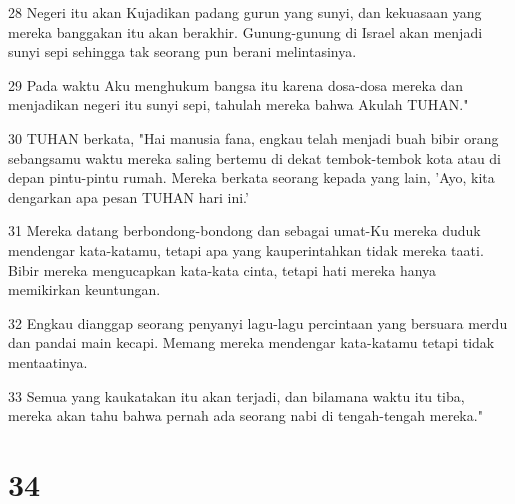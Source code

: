 \par 28 Negeri itu akan Kujadikan padang gurun yang sunyi, dan kekuasaan yang mereka banggakan itu akan berakhir. Gunung-gunung di Israel akan menjadi sunyi sepi sehingga tak seorang pun berani melintasinya.
\par 29 Pada waktu Aku menghukum bangsa itu karena dosa-dosa mereka dan menjadikan negeri itu sunyi sepi, tahulah mereka bahwa Akulah TUHAN."
\par 30 TUHAN berkata, "Hai manusia fana, engkau telah menjadi buah bibir orang sebangsamu waktu mereka saling bertemu di dekat tembok-tembok kota atau di depan pintu-pintu rumah. Mereka berkata seorang kepada yang lain, 'Ayo, kita dengarkan apa pesan TUHAN hari ini.'
\par 31 Mereka datang berbondong-bondong dan sebagai umat-Ku mereka duduk mendengar kata-katamu, tetapi apa yang kauperintahkan tidak mereka taati. Bibir mereka mengucapkan kata-kata cinta, tetapi hati mereka hanya memikirkan keuntungan.
\par 32 Engkau dianggap seorang penyanyi lagu-lagu percintaan yang bersuara merdu dan pandai main kecapi. Memang mereka mendengar kata-katamu tetapi tidak mentaatinya.
\par 33 Semua yang kaukatakan itu akan terjadi, dan bilamana waktu itu tiba, mereka akan tahu bahwa pernah ada seorang nabi di tengah-tengah mereka."

\chapter{34}

